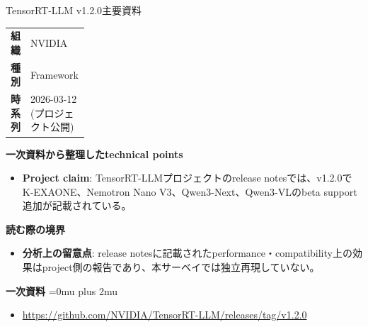 \begin{technicalnote}{TensorRT-LLM v1.2.0}{主要資料}
\begingroup
\begin{tabularx}{\linewidth}{@{}>{\bfseries}p{0.22\linewidth}X@{}}
組織 & NVIDIA \\
種別 & Framework \\
時系列 & 2026-03-12 (プロジェクト公開) \\
\end{tabularx}
\smallskip
{\bfseries 一次資料から整理したtechnical points}
\begin{itemize}[leftmargin=1.5em,itemsep=0.35em]
\item \textbf{Project claim}: TensorRT-LLMプロジェクトのrelease notesでは、v1.2.0でK-EXAONE、Nemotron Nano V3、Qwen3-Next、Qwen3-VLのbeta support追加が記載されている。
\end{itemize}
\begin{minipage}{\linewidth}
{\bfseries 読む際の境界}
\begin{itemize}[leftmargin=1.5em,itemsep=0.35em]
\item \textbf{分析上の留意点}: release notesに記載されたperformance・compatibility上の効果はproject側の報告であり、本サーベイでは独立再現していない。
\end{itemize}
\begin{samepage}
{\bfseries 一次資料}
\begingroup\sloppy
\Urlmuskip=0mu plus 2mu\relax
\begin{itemize}[leftmargin=1.5em,itemsep=0.25em]
\item {\scriptsize\url{https://github.com/NVIDIA/TensorRT-LLM/releases/tag/v1.2.0}}
\end{itemize}
\endgroup
\end{samepage}
\end{minipage}
\endgroup
\end{technicalnote}
\medskip

